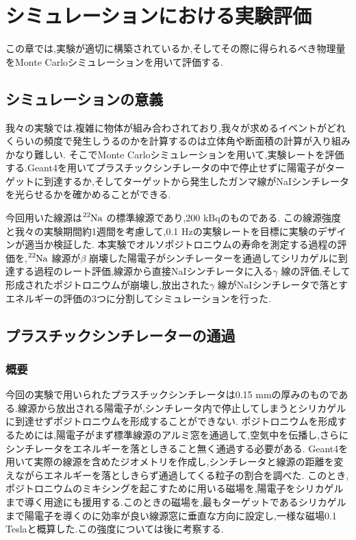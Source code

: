 \chapter{シミュレーションにおける実験評価}\label{simulation}

この章では,実験が適切に構築されているか,そしてその際に得られるべき物理量をMonte Carloシミュレーションを用いて評価する.


\section{シミュレーションの意義}

我々の実験では,複雑に物体が組み合わされており,我々が求めるイベントがどれくらいの頻度で発生しうるのかを計算するのは立体角や断面積の計算が入り組みかなり難しい.
そこでMonte Carloシミュレーションを用いて,実験レートを評価する.Geant4を用いてプラスチックシンチレータの中で停止せずに陽電子がターゲットに到達するか,そしてターゲットから発生したガンマ線がNaIシンチレータを光らせるかを確かめることができる.

今回用いた線源は$\ce{^{22}Na}$ の標準線源であり,200 kBqのものである.
この線源強度と我々の実験期間約1週間を考慮して,0.1 Hzの実験レートを目標に実験のデザインが適当か検証した.
本実験でオルソポジトロニウムの寿命を測定する過程の評価を,$\ce{^{22}Na}$ 線源が$\beta$ 崩壊した陽電子がシンチレーターを通過してシリカゲルに到達する過程のレート評価,線源から直接NaIシンチレータに入る$\gamma$ 線の評価,そして形成されたポジトロニウムが崩壊し,放出された$\gamma$ 線がNaIシンチレータで落とすエネルギーの評価の3つに分割してシミュレーションを行った.



\section{プラスチックシンチレーターの通過}

\subsection{概要}
今回の実験で用いられたプラスチックシンチレータは0.15 mmの厚みのものである.線源から放出される陽電子が,シンチレータ内で停止してしまうとシリカゲルに到達せずポジトロニウムを形成することができない.
ポジトロニウムを形成するためには,陽電子がまず標準線源のアルミ窓を通過して,空気中を伝播し,さらにシンチレータをエネルギーを落としきること無く通過する必要がある.
Geant4を用いて実際の線源を含めたジオメトリを作成し,シンチレータと線源の距離を変えながらエネルギーを落としきらず通過してくる粒子の割合を調べた.
このとき,ポジトロニウムのミキシングを起こすために用いる磁場を,陽電子をシリカゲルまで導く用途にも援用する.このときの磁場を,最もターゲットであるシリカゲルまで陽電子を導くのに効率が良い線源窓に垂直な方向に設定し,一様な磁場0.1 Teslaと概算した.この強度については後に考察する.

